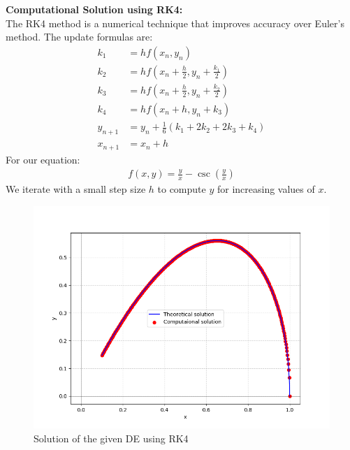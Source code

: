 \documentclass[journal]{IEEEtran}
\begin{document}
\textbf{Computational Solution using RK4:} \\
The RK4 method is a numerical technique that improves accuracy over Euler’s method. The update formulas are:
\begin{align}
    k_1 &= h f(x_n, y_n) \\
    k_2 &= h f\left(x_n + \frac{h}{2}, y_n + \frac{k_1}{2}\right) \\
    k_3 &= h f\left(x_n + \frac{h}{2}, y_n + \frac{k_2}{2}\right) \\
    k_4 &= h f\left(x_n + h, y_n + k_3\right) \\
    y_{n+1} &= y_n + \frac{1}{6} (k_1 + 2k_2 + 2k_3 + k_4) \\
    x_{n+1} &= x_n + h
\end{align}
For our equation:
\begin{align}
    f(x, y) = \frac{y}{x} - \csc{\left(\frac{y}{x}\right)}
\end{align}
We iterate with a small step size $h$ to compute $y$ for increasing values of $x$.
\begin{figure}[!ht]
    \centering
    \includegraphics[width=\columnwidth]{figs/Figure_1.png}
    \caption{Solution of the given DE using RK4}
    \label{fig:rk4_solution}
\end{figure}
\end{document}
